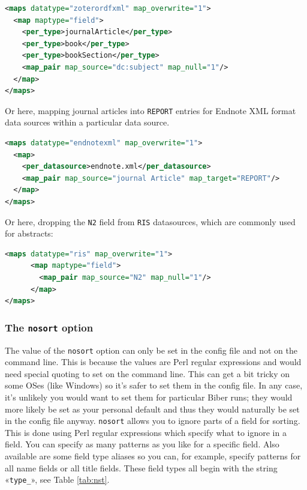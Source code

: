 \documentclass{ltxdockit}
\begin{document}
\begin{lstlisting}[language=xml,escapechar=+,mathescape=true]
<maps datatype="zoterordfxml" map_overwrite="1">
  <map maptype="field">
    <per_type>journalArticle</per_type>
    <per_type>book</per_type>
    <per_type>bookSection</per_type>
    <map_pair map_source="dc:subject" map_null="1"/>
  </map>
</maps>
\end{lstlisting}

\noindent Or here, mapping journal articles into \verb+REPORT+ entries for
Endnote XML format data sources within a particular data source.

\begin{lstlisting}[language=xml,escapechar=+,mathescape=true]
<maps datatype="endnotexml" map_overwrite="1">
  <map>
    <per_datasource>endnote.xml</per_datasource>
    <map_pair map_source="journal Article" map_target="REPORT"/>
  </map>
</maps>
\end{lstlisting}

\noindent Or here, dropping the \verb+N2+ field from \verb+RIS+
datasources, which are commonly used for abstracts:

\begin{lstlisting}[language=xml,escapechar=+,mathescape=true]
<maps datatype="ris" map_overwrite="1">
      <map maptype="field">
        <map_pair map_source="N2" map_null="1"/>
      </map>
</maps>
\end{lstlisting}
\bigskip
\subsubsection{The \texttt{nosort} option}\label{nosort}

The value of the \verb+nosort+ option can only be set in the config file
and not on the command line. This is because the values are Perl regular
expressions and would need special quoting to set on the command line. This
can get a bit tricky on some OSes (like Windows) so it's safer to set them
in the config file. In any case, it's unlikely you would want to set them
for particular Biber runs; they would more likely be set as your
personal default and thus they would naturally be set in the config file
anyway. \verb+nosort+ allows you to ignore parts of a field for sorting.
This is done using Perl regular expressions which specify what to
ignore in a field. You can specify as many patterns as you like for a
specific field. Also available are some field type aliases so you can, for
example, specify patterns for all name fields or all title fields. These
field types all begin with the string «\verb+type_+», see Table
\ref{tab:nst}.
\end{document}
